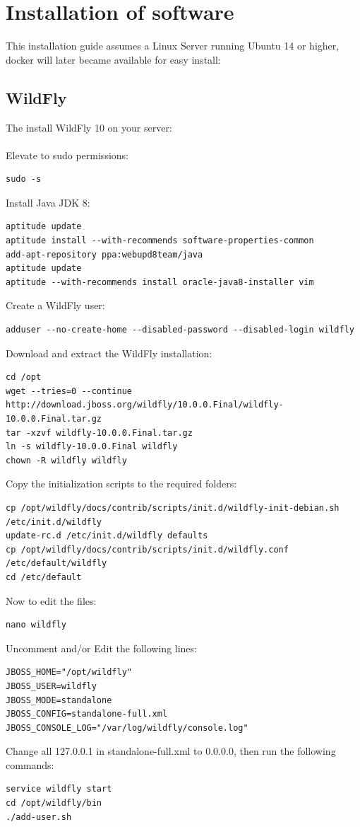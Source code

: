 \documentclass[11pt,a4paper]{article}
\begin{document}
\section{Installation of software}

This installation guide assumes a Linux Server running Ubuntu 14 or higher, docker will later became available for easy install:

\subsection{WildFly}
The install WildFly 10 on your server: \\\\
Elevate to sudo permissions:

\begin{lstlisting}
sudo -s
\end{lstlisting}
Install Java JDK 8:
\begin{lstlisting}
aptitude update
aptitude install --with-recommends software-properties-common
add-apt-repository ppa:webupd8team/java
aptitude update
aptitude --with-recommends install oracle-java8-installer vim
\end{lstlisting}
Create a WildFly user:
\begin{lstlisting}
adduser --no-create-home --disabled-password --disabled-login wildfly
\end{lstlisting}
Download and extract the WildFly installation:
\begin{lstlisting}
cd /opt
wget --tries=0 --continue http://download.jboss.org/wildfly/10.0.0.Final/wildfly-10.0.0.Final.tar.gz
tar -xzvf wildfly-10.0.0.Final.tar.gz
ln -s wildfly-10.0.0.Final wildfly
chown -R wildfly wildfly
\end{lstlisting}
\pagebreak
Copy the initialization scripts to the required folders:
\begin{lstlisting}
cp /opt/wildfly/docs/contrib/scripts/init.d/wildfly-init-debian.sh /etc/init.d/wildfly
update-rc.d /etc/init.d/wildfly defaults
cp /opt/wildfly/docs/contrib/scripts/init.d/wildfly.conf /etc/default/wildfly
cd /etc/default
\end{lstlisting}
Now to edit the files:
\begin{lstlisting}
nano wildfly
\end{lstlisting}
Uncomment and/or Edit the following lines:
\begin{lstlisting}
JBOSS_HOME="/opt/wildfly"
JBOSS_USER=wildfly
JBOSS_MODE=standalone
JBOSS_CONFIG=standalone-full.xml
JBOSS_CONSOLE_LOG="/var/log/wildfly/console.log"
\end{lstlisting}
Change all 127.0.0.1 in standalone-full.xml to 0.0.0.0, then run the following commands:
\begin{lstlisting}
service wildfly start
cd /opt/wildfly/bin
./add-user.sh
\end{lstlisting}
\end{document}
